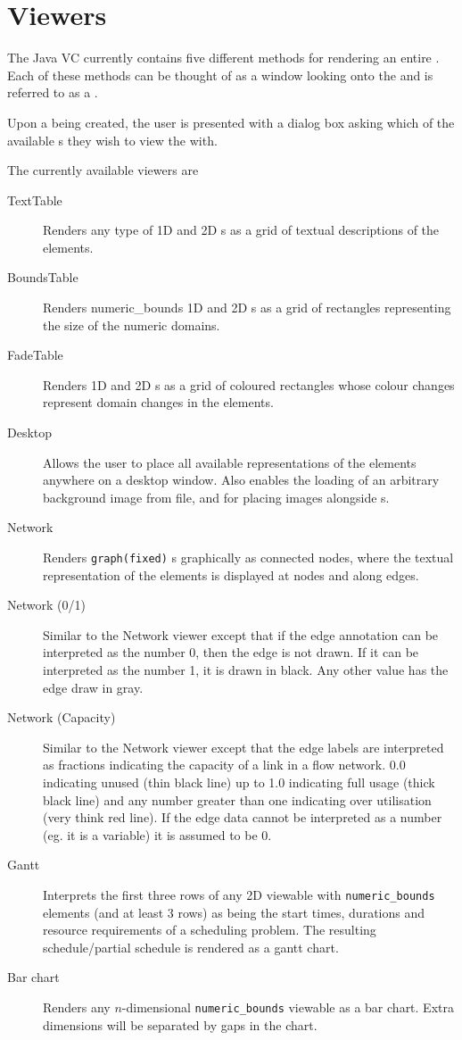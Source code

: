 \section{Viewers}

The Java VC currently contains five different methods for rendering
an entire \viewable{}.  Each of these methods can be thought of as a
window looking onto the \viewable{} and is referred to as a \viewer{}.

Upon a \viewable{} being created, the user is presented with a dialog
box asking which of the available \viewer{}s they wish to view the
\viewable{} with.

The currently available viewers are
\begin{description}
\item[TextTable] Renders any type of 1D and 2D \viewable{}s as a grid
of textual descriptions of the elements.
\item[BoundsTable] Renders numeric_bounds 1D and 2D \viewable{}s as a
grid of rectangles representing the size of the numeric domains.
\item[FadeTable] Renders 1D and 2D \viewable{}s as a grid of coloured
rectangles whose colour changes represent domain changes in the
\viewable{} elements.
\item[Desktop] Allows the user to place all available representations
of the \viewable{} elements anywhere on a desktop window.  Also
enables the loading of an arbitrary background image from file, and for
placing images alongside \viewlet{}s.
\item[Network] Renders \texttt{graph(fixed)} \viewable{}s graphically
as connected nodes, where the textual representation of the
\viewable{} elements is displayed at nodes and along edges.
\item[Network (0/1)] Similar to the Network viewer except that if the
edge annotation can be interpreted as the number 0, then the edge is
not drawn.  If it can be interpreted as the number 1, it is drawn in
black.  Any other value has the edge draw in gray.
\item[Network (Capacity)] Similar to the Network viewer except that
the edge labels are interpreted as fractions indicating the capacity
of a link in a flow network.  0.0 indicating unused (thin black line)
up to 1.0 indicating full usage (thick black line) and any number
greater than one indicating over utilisation (very think red line).
If the edge data cannot be interpreted as a number (eg. it is a
variable) it is assumed to be 0.
\item[Gantt] Interprets the first three rows of any 2D viewable with
\texttt{numeric_bounds} elements (and at least 3 rows) as being the
start times, durations and resource requirements of a scheduling
problem.  The resulting schedule/partial schedule is rendered as a
gantt chart.
\item[Bar chart] Renders any $n$-dimensional \texttt{numeric_bounds}
viewable as a bar chart.  Extra dimensions will be separated by gaps
in the chart.
\end{description}


